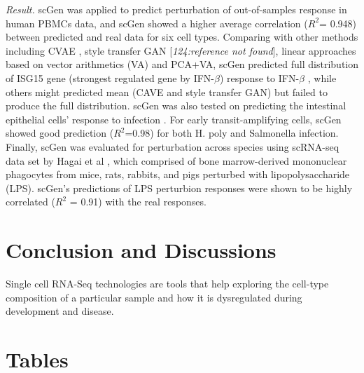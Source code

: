 \documentclass[
]{book}
\begin{document}
\emph{Result.} scGen was applied to predict perturbation of out-of-samples response in human PBMCs data, and scGen showed a higher average correlation (\(R^{2}\)= 0.948) between predicted and real data for six cell types. Comparing with other methods including CVAE \citep{RN201}, style transfer GAN {[}\emph{124:reference not found}{]}, linear approaches based on vector arithmetics (VA) \citep{RN179} and PCA+VA, scGen predicted full distribution of ISG15 gene (strongest regulated gene by IFN-\(\beta\)) response to IFN-\(\beta\) \citep{RN218}, while others might predicted mean (CAVE and style transfer GAN) but failed to produce the full distribution. scGen was also tested on predicting the intestinal epithelial cells' response to infection \citep{RN226}. For early transit-amplifying cells, scGen showed good prediction (\(R^{2}\)=0.98) for both H. poly and Salmonella infection. Finally, scGen was evaluated for perturbation across species using scRNA-seq data set by Hagai et al \citep{RN202}, which comprised of bone marrow-derived mononuclear phagocytes from mice, rats, rabbits, and pigs perturbed with lipopolysaccharide (LPS). scGen's predictions of LPS perturbion responses were shown to be highly correlated (\(R^{2}\) = 0.91) with the real responses.

\hypertarget{ch-6}{%
\chapter{Conclusion and Discussions}\label{ch-6}}

Single cell RNA-Seq technologies are tools that help exploring the cell-type composition of a particular sample and how it is dysregulated during development and disease.

\hypertarget{ch-7}{%
\chapter{Tables}\label{ch-7}}
\end{document}
